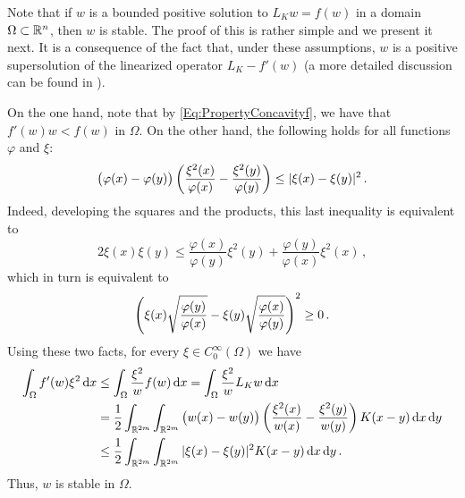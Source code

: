 \begin{remark}
	\label{Remark:Stability}
	Note that if $w$ is a bounded positive solution to $L_K w = f(w)$ in a domain $\Omega\subset \mathbb{R}^n$, then $w$ is stable. The proof of this is rather simple and we present it next. It is a consequence of the fact that, under these assumptions, $w$ is a positive supersolution of the linearized operator $L_K - f'(w)$ (a more detailed discussion can be found in \cite{HamelRosOtonSireValdinoci}). 
	
	On the one hand, note that by \eqref{Eq:PropertyConcavityf}, we have that $f'(w)w<f(w)$ in $\Omega$. On the other hand, the following holds for all functions $\varphi$ and $\xi$:
	\begin{equation}
	\label{Eq:IdentityStability}
	\big (\varphi(x) - \varphi(y) \big) \left ( {\dfrac{\xi^2(x)}{\varphi(x)} - \dfrac{\xi^2(y)}{\varphi(y)} }\right ) \leq |\xi (x) - \xi(y)|^2\,.
	\end{equation}
	Indeed, developing the squares and the products, this last inequality is equivalent to
	$$
	2 \xi(x) \xi(y) \leq \dfrac{\varphi(x)}{\varphi(y)} \xi^2(y) +  \dfrac{\varphi(y)}{\varphi(x)} \xi^2 (x)\,,
	$$
	which in turn is equivalent to
	$$
	\left ( {\xi (x)\sqrt{\dfrac{\varphi(y)}{\varphi(x)}} - \xi(y) \sqrt{\dfrac{\varphi(x)}{\varphi(y)} } }\right )^2 \geq 0\,.
	$$
	Using these two facts, for every $\xi\in C^\infty_0(\Omega)$ we have
	\begin{align*}
	\int_\Omega f'(w) \xi^2 \,\mathrm{d} x & \leq \int_\Omega  \dfrac{\xi^2}{w} f(w) \,\mathrm{d} x = \int_\Omega  \dfrac{\xi^2}{w} L_Kw \,\mathrm{d} x \\ 
	&= \dfrac{1}{2} \int_{\mathbb{R}^{2m}} \int_{\mathbb{R}^{2m}} \big ( w(x) - w(y) \big) \left ( {\dfrac{\xi^2(x)}{w(x)} - \dfrac{\xi^2(y)}{w(y)} }\right ) K(x - y) \,\mathrm{d} x \,\mathrm{d} y
	\\ 
	&\leq \dfrac{1}{2} \int_{\mathbb{R}^{2m}} \int_{\mathbb{R}^{2m}} |\xi (x) - \xi(y)|^2 K(x - y) \,\mathrm{d} x \,\mathrm{d} y\,.
	\end{align*}
	Thus, $w$ is stable in $\Omega$.	
\end{remark}


